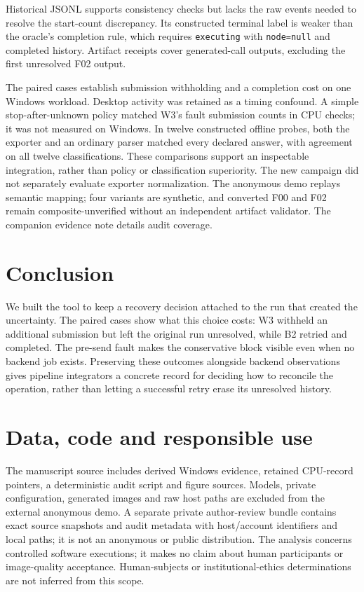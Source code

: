 \documentclass[conference,letterpaper,10pt]{IEEEtran}
\begin{document}
Historical JSONL supports consistency checks but lacks the raw events needed to
resolve the start-count discrepancy. Its constructed terminal label is weaker
than the oracle's completion rule, which requires \texttt{executing} with
\texttt{node=null} and completed history. Artifact receipts cover generated-call
outputs, excluding the first unresolved F02 output.

The paired cases establish submission withholding and a completion cost on one
Windows workload. Desktop activity was retained as a timing confound. A simple
stop-after-unknown policy matched W3's fault submission counts in CPU checks;
it was not measured on Windows. In twelve constructed offline probes, both the
exporter and an ordinary parser matched every declared answer, with agreement
on all twelve classifications. These comparisons support
an inspectable integration, rather than policy or classification superiority.
The new campaign did not separately evaluate exporter normalization.
The anonymous demo replays semantic mapping; four variants are
synthetic, and converted F00 and F02 remain composite-unverified without an
independent artifact validator. The companion evidence note details audit
coverage.

\section{Conclusion}

We built the tool to keep a recovery decision attached to the run that created
the uncertainty. The paired cases show what this choice costs: W3 withheld an
additional submission but left the original run unresolved, while B2 retried and
completed. The pre-send fault makes the conservative block visible even when
no backend job exists. Preserving these outcomes alongside backend observations
gives pipeline integrators a concrete record for deciding how to reconcile the
operation, rather than letting a successful retry erase its unresolved history.

\section*{Data, code and responsible use}
The manuscript source includes derived Windows evidence, retained CPU-record
pointers, a deterministic audit script and figure sources. Models, private
configuration, generated images and raw host paths are excluded from the
external anonymous demo. A separate private author-review bundle contains exact
source snapshots and audit metadata with host/account identifiers and local
paths; it is not an anonymous or public distribution. The analysis concerns controlled software executions; it makes
no claim about human participants or image-quality acceptance. Human-subjects
or institutional-ethics determinations are not inferred from this scope.
\end{document}
